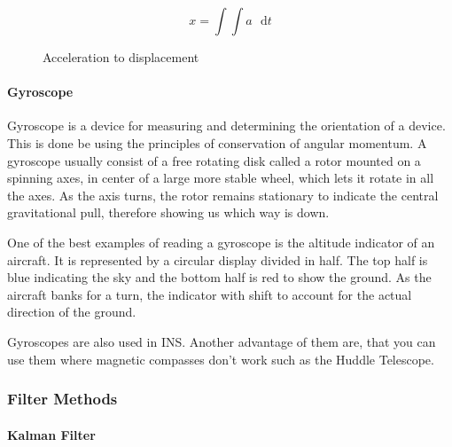 \begin{figure}[H]
\[
x=\int\int a\mathrm{\text{ }d}t
\]
 

\protect\caption{Acceleration to displacement}


\end{figure}



\paragraph{Gyroscope}

Gyroscope is a device for measuring and determining the orientation
of a device. This is done be using the principles of conservation
of angular momentum. A gyroscope usually consist of a free rotating
disk called a rotor mounted on a spinning axes, in center of a large
more stable wheel, which lets it rotate in all the axes. As the axis
turns, the rotor remains stationary to indicate the central gravitational
pull, therefore showing us which way is down.

One of the best examples of reading a gyroscope is the altitude indicator
of an aircraft. It is represented by a circular display divided in
half. The top half is blue indicating the sky and the bottom half
is red to show the ground. As the aircraft banks for a turn, the indicator
with shift to account for the actual direction of the ground.

Gyroscopes are also used in INS. Another advantage of them are, that
you can use them where magnetic compasses don't work such as the Huddle
Telescope\cite{gyroscope-wiki}.

\subsubsection{Filter Methods} \label{filter_methods}


\paragraph{Kalman Filter}

